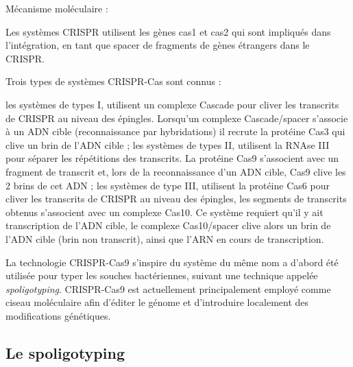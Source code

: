 \documentclass[twoside,a4paper,11pt,frenchb,openany]{report}
\begin{document}
Mécanisme moléculaire :

Les systèmes CRISPR utilisent les gènes cas1 et cas2 qui sont impliqués dans l'intégration, en tant que spacer de fragments de gènes étrangers dans le CRISPR.

Trois types de systèmes CRISPR-Cas sont connus :

les systèmes de types I, utilisent un complexe Cascade pour cliver les transcrits de CRISPR au niveau des épingles. Lorsqu'un complexe Cascade/spacer s'associe à un ADN cible (reconnaissance par hybridations) il recrute la protéine Cas3 qui clive un brin de l'ADN cible ;
les systèmes de types II, utilisent la RNAse III pour séparer les répétitions des transcrits. La protéine Cas9 s'associent avec un fragment de transcrit et, lors de la reconnaissance d'un ADN cible, Cas9 clive les 2 brins de cet ADN ;
les systèmes de type III, utilisent la protéine Cas6 pour cliver les transcrits de CRISPR au niveau des épingles, les segments de transcrits obtenus s'associent avec un complexe Cas10. Ce système requiert qu'il y ait transcription de l'ADN cible, le complexe Cas10/spacer clive alors un brin de l'ADN cible (brin non transcrit), ainsi que l'ARN en cours de transcription.


La technologie CRISPR-Cas9 s'inspire du système du même nom a d'abord été utilisée pour typer les souches bactériennes, suivant une technique appelée \textit{spoligotyping}. CRISPR-Cas9 est actuellement principalement employé comme ciseau moléculaire afin d'éditer le génome et d'introduire localement des modifications génétiques.


\subsection{Le spoligotyping}
\end{document}
